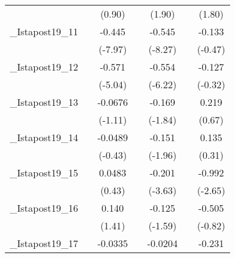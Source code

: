 {\begin{tabular}{l*{6}{c}}
            &                     &      (0.90)         &                     &      (1.90)         &                     &      (1.80)         \\
[1em]
\_Istapost19\_11&                     &      -0.445\sym{***}&                     &      -0.545\sym{***}&                     &      -0.133         \\
            &                     &     (-7.97)         &                     &     (-8.27)         &                     &     (-0.47)         \\
[1em]
\_Istapost19\_12&                     &      -0.571\sym{***}&                     &      -0.554\sym{***}&                     &      -0.127         \\
            &                     &     (-5.04)         &                     &     (-6.22)         &                     &     (-0.32)         \\
[1em]
\_Istapost19\_13&                     &     -0.0676         &                     &      -0.169         &                     &       0.219         \\
            &                     &     (-1.11)         &                     &     (-1.84)         &                     &      (0.67)         \\
[1em]
\_Istapost19\_14&                     &     -0.0489         &                     &      -0.151         &                     &       0.135         \\
            &                     &     (-0.43)         &                     &     (-1.96)         &                     &      (0.31)         \\
[1em]
\_Istapost19\_15&                     &      0.0483         &                     &      -0.201\sym{***}&                     &      -0.992\sym{*}  \\
            &                     &      (0.43)         &                     &     (-3.63)         &                     &     (-2.65)         \\
[1em]
\_Istapost19\_16&                     &       0.140         &                     &      -0.125         &                     &      -0.505         \\
            &                     &      (1.41)         &                     &     (-1.59)         &                     &     (-0.82)         \\
[1em]
\_Istapost19\_17&                     &     -0.0335         &                     &     -0.0204         &                     &      -0.231         \\

\end{tabular}}
